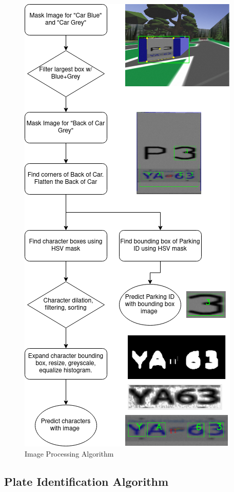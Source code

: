 \documentclass[titlepage, twocolumn]{article}
\begin{document}
\begin{figure}
\centering
\includegraphics[width=0.9\linewidth]{Image Processing Algorithm.drawio.png}
\caption{Image Processing Algorithm}
\label{fig:platepipeline}
\end{figure}

\subsection{Plate Identification Algorithm}
\end{document}
